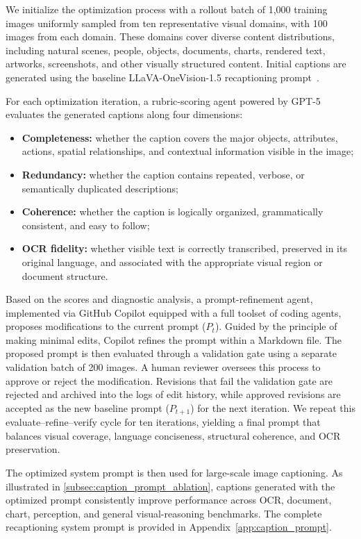 We initialize the optimization process with a rollout batch of 1,000 training images uniformly sampled from ten representative visual domains, with 100 images from each domain. These domains cover diverse content distributions, including natural scenes, people, objects, documents, charts, rendered text, artworks, screenshots, and other visually structured content. Initial captions are generated using the baseline LLaVA-OneVision-1.5 recaptioning prompt~\cite{li2024llavaonevision15}.


For each optimization iteration, a rubric-scoring agent powered by GPT-5 evaluates the generated captions along four dimensions:
\begin{itemize}
    \item \textbf{Completeness:} whether the caption covers the major objects, attributes, actions, spatial relationships, and contextual information visible in the image;
    \item \textbf{Redundancy:} whether the caption contains repeated, verbose, or semantically duplicated descriptions;
    \item \textbf{Coherence:} whether the caption is logically organized, grammatically consistent, and easy to follow;
    \item \textbf{OCR fidelity:} whether visible text is correctly transcribed, preserved in its original language, and associated with the appropriate visual region or document structure.
\end{itemize}

Based on the scores and diagnostic analysis, a prompt-refinement agent, implemented via GitHub Copilot equipped with a full toolset of coding agents, proposes modifications to the current prompt ($P_t$). Guided by the principle of making minimal edits, Copilot refines the prompt within a Markdown file. The proposed prompt is then evaluated through a validation gate using a separate validation batch of 200 images. A human reviewer oversees this process to approve or reject the modification. Revisions that fail the validation gate are rejected and archived into the logs of edit history, while approved revisions are accepted as the new baseline prompt ($P_{t+1}$) for the next iteration. We repeat this evaluate--refine--verify cycle for ten iterations, yielding a final prompt that balances visual coverage, language conciseness, structural coherence, and OCR preservation.

The optimized system prompt is then used for large-scale image captioning. As illustrated in \cref{subsec:caption_prompt_ablation}, captions generated with the optimized prompt consistently improve performance across OCR, document, chart, perception, and general visual-reasoning benchmarks. The complete recaptioning system prompt is provided in Appendix~\ref{app:caption_prompt}.

